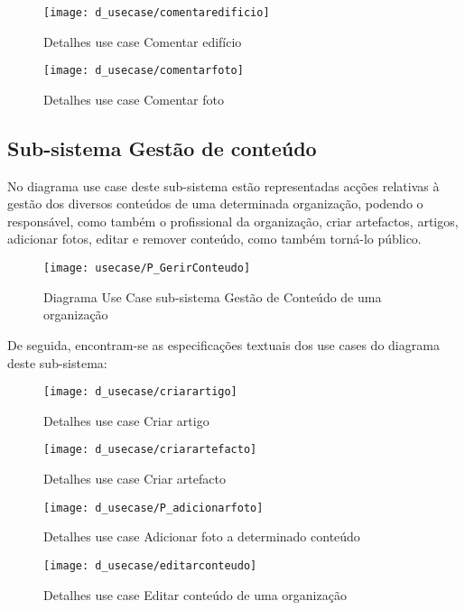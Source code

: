 \documentclass[12pt,a4paper]{article}
\begin{document}
\begin{figure}[h!]
\centering
\texttt{[image: d\_usecase/comentaredificio]}
\label{usecase}
\caption{Detalhes use case Comentar edifício}
\end{figure}

\begin{figure}[h!]
\centering
\texttt{[image: d\_usecase/comentarfoto]}
\label{usecase}
\caption{Detalhes use case Comentar foto}
\end{figure}

\clearpage


\subsection{Sub-sistema Gestão de conteúdo}
No diagrama use case deste sub-sistema estão representadas acções relativas à gestão dos diversos conteúdos de uma determinada organização, podendo o responsável, como também o profissional da organização, criar artefactos, artigos, adicionar fotos, editar e remover conteúdo, como também torná-lo público.\\

\begin{figure}[h!]
\centering
\texttt{[image: usecase/P\_GerirConteudo]}
\label{usecase}
\caption{Diagrama Use Case sub-sistema Gestão de Conteúdo de uma organização}
\end{figure}

De seguida, encontram-se as especificações textuais dos use cases do diagrama deste sub-sistema:\\

\begin{figure}[h!]
\centering
\texttt{[image: d\_usecase/criarartigo]}
\label{usecase}
\caption{Detalhes use case Criar artigo}
\end{figure}

\begin{figure}[h!]
\centering
\texttt{[image: d\_usecase/criarartefacto]}
\label{usecase}
\caption{Detalhes use case Criar artefacto}
\end{figure}

\begin{figure}[h!]
\centering
\texttt{[image: d\_usecase/P\_adicionarfoto]}
\label{usecase}
\caption{Detalhes use case Adicionar foto a determinado conteúdo}
\end{figure}

\begin{figure}[h!]
\centering
\texttt{[image: d\_usecase/editarconteudo]}
\label{usecase}
\caption{Detalhes use case Editar conteúdo de uma organização}
\end{figure}
\end{document}
